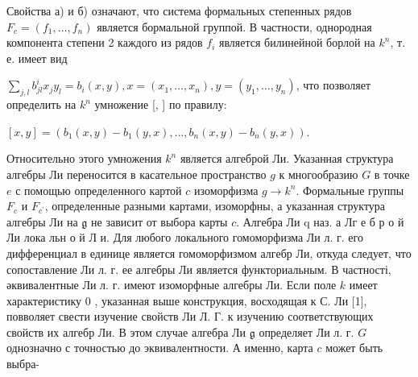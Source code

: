 \documentclass[10pt]{article}
\begin{document}
Свойства а) и б) означают, что система формальных степенных рядов $F_{c}=\left(f_{1}, \ldots, f_{n}\right)$ является бормальной группой. В частности, однородная компонента степени 2 каждого из рядов $f_{i}$ является билинейной борлой на $k^{n}$, т. е. имеет вид



$\sum_{j, l} b_{j l}^{i} x_{j} y_{l}=b_{i}(x, y), x=\left(x_{1}, \ldots, x_{n}\right), y=\left(y_{1}, \ldots, y_{n}\right)$, что позволяет определить на $k^{n}$ умножение [, ] по правилу:



$[x, y]=\left(b_{1}(x, y)-b_{1}(y, x), \ldots, b_{n}(x, y)-b_{n}(y, x)\right)$.



Относительно этого умножения $k^{n}$ является алгеброй Ли. Указанная структура алгебры Ли переносится в касательное пространство $g$ к многообразию $G$ в точке $e$ с помощью определенного картой $c$ изоморфизма $g \rightarrow k^{n}$. Формальные группы $F_{c}$ и $F_{c^{\prime}}$, определенные разными картами, изоморфны, а указанная структура алгебры Ли на $\mathfrak{g}$ не зависит от выбора карты $c$. Алгебра Ли q наз. а Лг е б р о й Ли лока льн о й Л и. Для любого локального гомоморфизма Ли л. г. его дифференциал в единице является гомоморфизмом алгебр Ли, откуда следует, что сопоставление Ли л. г. ее алгебры Ли является функториальным. В частності, әквивалентные Ли л. г. имеют изоморфные алгебры Ли. Если поле $k$ имеет характеристику 0 , указанная выше конструкция, восходящая к С. Ли [1], повволяет свести изучение свойств Ли Л. Г. к изучению соответствующих свойств их алгебр Ли. В этом случае алгебра Ли $\mathfrak{g}$ определяет Ли л. г. $G$ однозначно с точностью до эквивалентности. А именно, карта $c$ может быть выбра-
\end{document}
